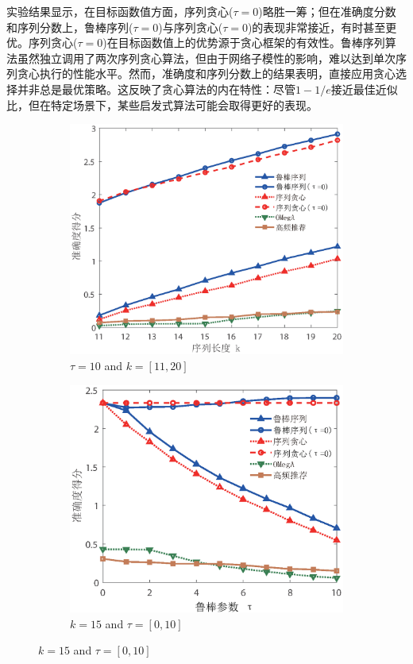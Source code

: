 实验结果显示，在目标函数值方面，序列贪心($\tau=0$)略胜一筹；但在准确度分数和序列分数上，鲁棒序列($\tau=0$)与序列贪心($\tau=0$)的表现非常接近，有时甚至更优。序列贪心($\tau=0$)在目标函数值上的优势源于贪心框架的有效性。鲁棒序列算法虽然独立调用了两次序列贪心算法，但由于网络子模性的影响，难以达到单次序列贪心执行的性能水平。然而，准确度和序列分数上的结果表明，直接应用贪心选择并非总是最优策略。这反映了贪心算法的内在特性：尽管$1-1/e$接近最佳近似比，但在特定场景下，某些启发式算法可能会取得更好的表现。
\begin{figure}[H]
    \centering
    \begin{subfigure}{0.45\textwidth}
        \includegraphics[width=\linewidth]{figure/rosenets/rec/rec-acc1}
        \caption{$\tau=10$ and $k=[11,20]$}
        \label{fig:rec-acc}
    \end{subfigure}
    \hfill
    \begin{subfigure}{0.45\textwidth}
        \includegraphics[width=\linewidth]{figure/rosenets/rec/rec-acc1-t}
        \caption{$k=15$ and $\tau=[0,10]$}
        \label{fig:rec-acc-t}
    \end{subfigure}


\end{figure}
